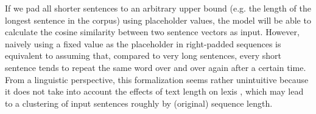 \documentclass[runningheads]{llncs}
\begin{document}
If we pad all shorter sentences to an arbitrary upper bound (e.g. the length of the longest sentence in the corpus) using placeholder values, the model will be able to calculate the cosine similarity \parencite[3]{luoCosineNormalizationUsing2017} between two sentence vectors as input. However, naively using a fixed value as the placeholder in right-padded sequences \parencite[386]{sachanEffectiveUseBidirectional2018} is equivalent to assuming that, compared to very long sentences, every short sentence tends to repeat the same word over and over again after a certain time. From a linguistic perspective, this formalization seems rather unintuitive because it does not take into account the effects of text length on lexis \parencites[31]{golcherStylometryInterplayTopic2011}[141]{ochabStylometryLiteraryPapyri2019}, which may lead to a clustering of input sentences roughly by (original) sequence length.
\end{document}
